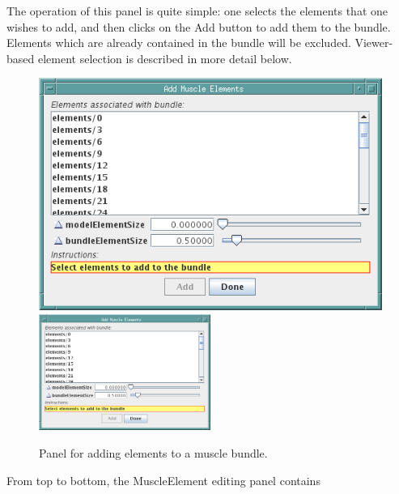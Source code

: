\documentclass{article}
\begin{document}
The operation of this panel is quite simple: one selects the elements
that one wishes to add, and then clicks on the {\sf Add} button to add
them to the bundle. Elements which are already contained in the bundle
will be excluded. Viewer-based element selection is described
in more detail below.

\begin{figure}
\begin{center}
\iflatexml
\includegraphics[]{images/addMuscleElementsPanel}
\else
\includegraphics[width=0.50\textwidth]{images/addMuscleElementsPanel}
\fi
\end{center}
\caption{Panel for adding elements to a muscle bundle.}%
\label{addMuscleElementsPanelFig}
\end{figure}

From top to bottom, the MuscleElement editing panel contains
\end{document}
